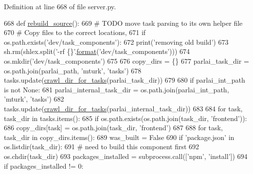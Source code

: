 Definition at line 668 of file server.\+py.


\begin{DoxyCode}
668 \textcolor{keyword}{def }\hyperlink{namespaceparlai_1_1mturk_1_1webapp_1_1server_a0ce17c85e37b7734ab2fbaca711cb45f}{rebuild\_source}():
669     \textcolor{comment}{# TODO move task parsing to its own helper file}
670     \textcolor{comment}{# Copy files to the correct locations,}
671     \textcolor{keywordflow}{if} os.path.exists(\textcolor{stringliteral}{'dev/task\_components'}):
672         print(\textcolor{stringliteral}{'removing old build'})
673         sh.rm(shlex.split(\textcolor{stringliteral}{'-rf \{\}'}.\hyperlink{namespaceparlai_1_1chat__service_1_1services_1_1messenger_1_1shared__utils_a32e2e2022b824fbaf80c747160b52a76}{format}(\textcolor{stringliteral}{'dev/task\_components'})))
674     os.mkdir(\textcolor{stringliteral}{'dev/task\_components'})
675 
676     copy\_dirs = \{\}
677     parlai\_task\_dir = os.path.join(parlai\_path, \textcolor{stringliteral}{'mturk'}, \textcolor{stringliteral}{'tasks'})
678     tasks.update(\hyperlink{namespaceparlai_1_1mturk_1_1webapp_1_1server_a0f5381b2282125d20fe12c40f6ed2ad3}{crawl\_dir\_for\_tasks}(parlai\_task\_dir))
679 
680     \textcolor{keywordflow}{if} parlai\_int\_path \textcolor{keywordflow}{is} \textcolor{keywordflow}{not} \textcolor{keywordtype}{None}:
681         parlai\_internal\_task\_dir = os.path.join(parlai\_int\_path, \textcolor{stringliteral}{'mturk'}, \textcolor{stringliteral}{'tasks'})
682         tasks.update(\hyperlink{namespaceparlai_1_1mturk_1_1webapp_1_1server_a0f5381b2282125d20fe12c40f6ed2ad3}{crawl\_dir\_for\_tasks}(parlai\_internal\_task\_dir))
683 
684     \textcolor{keywordflow}{for} task, task\_dir \textcolor{keywordflow}{in} tasks.items():
685         \textcolor{keywordflow}{if} os.path.exists(os.path.join(task\_dir, \textcolor{stringliteral}{'frontend'})):
686             copy\_dirs[task] = os.path.join(task\_dir, \textcolor{stringliteral}{'frontend'})
687 
688     \textcolor{keywordflow}{for} task, task\_dir \textcolor{keywordflow}{in} copy\_dirs.items():
689         was\_built = \textcolor{keyword}{False}
690         \textcolor{keywordflow}{if} \textcolor{stringliteral}{'package.json'} \textcolor{keywordflow}{in} os.listdir(task\_dir):
691             \textcolor{comment}{# need to build this component first}
692             os.chdir(task\_dir)
693             packages\_installed = subprocess.call([\textcolor{stringliteral}{'npm'}, \textcolor{stringliteral}{'install'}])
694             \textcolor{keywordflow}{if} packages\_installed != 0:

\end{DoxyCode}
